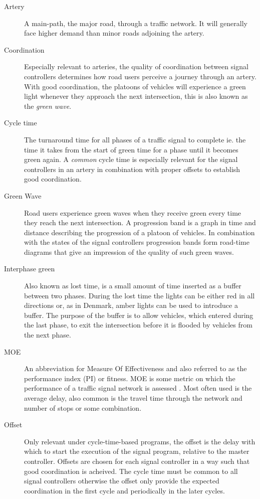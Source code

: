 \begin{description}

\item[Artery] A main-path, the major road, through a traffic network. It will generally face higher demand than minor roads adjoining the artery.
			
\item[Coordination] Especially relevant to arteries, the quality of coordination between signal controllers determines how road users perceive a journey through an artery. With good coordination, the platoons of vehicles will experience a green light whenever they approach the next intersection, this is also known as the \textit{green wave}.
			
\item[Cycle time] The turnaround time for all phases of a traffic signal to complete ie. the time it takes from the start of green time for a phase until it becomes green again. A \textit{common} cycle time is especially relevant for the signal controllers in an artery in combination with proper offsets to establish good coordination.

\item[Green Wave] Road users experience green waves when they receive green every time they reach the next intersection. A progression band is a graph in time and distance describing the progression of a platoon of vehicles. In combination with the states of the signal controllers progression bands form road-time diagrams that give an impression of the quality of such green waves.

\item[Interphase green] Also known as lost time, is a small amount of time inserted as a buffer between two phases. During the lost time the lights can be either red in all directions or, as in Denmark, amber lights can be used to introduce a buffer. The purpose of the buffer is to allow vehicles, which entered during the last phase, to exit the intersection before it is flooded by vehicles from the next phase.

\item[MOE] An abbreviation for Measure Of Effectiveness and also referred to as the performance index (PI) or fitness. MOE is some metric on which the performance of a traffic signal network is assessed .
	Most often used is the average delay, also common is the travel time through the network and number of stops or some combination.
	
\item[Offset] Only relevant under cycle-time-based programs, the offset is the delay with which to start the execution of the signal program, relative to the master controller. Offsets are chosen for each signal controller in a way such that good coordination is acheived. The cycle time must be common to all signal controllers otherwise the offset only provide the expected coordination in the first cycle and periodically in the later cycles.
	

\end{description}
